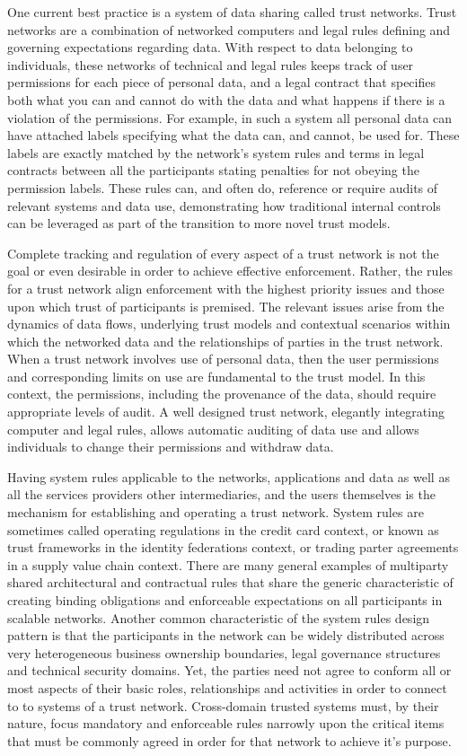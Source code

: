 One current best practice is a system of data sharing called trust networks.
Trust networks are a combination of networked computers and legal rules defining and governing expectations regarding data.
With respect to data belonging to individuals, these networks of technical and legal rules keeps track of user permissions for each piece of personal data, and a legal contract that specifies both what you can and cannot do with the data and what happens if there is a violation of the permissions.
For example, in such a system all personal data can have attached labels specifying what the data can, and cannot, be used for.
These labels are exactly matched by the network's system rules and terms in legal contracts between all the participants stating penalties for not obeying the permission labels.
These rules can, and often do, reference or require audits of relevant systems and data use, demonstrating how traditional internal controls can be leveraged as part of the transition to more novel trust models.

Complete tracking and regulation of every aspect of a trust network is not the goal or even desirable in order to achieve effective enforcement.
Rather, the rules for a trust network align enforcement with the highest priority issues and those upon which trust of participants is premised.
The relevant issues arise from the dynamics of data flows, underlying trust models and contextual scenarios within which the networked data and the relationships of parties in the trust network. 
When a trust network involves use of personal data, then the user permissions and corresponding limits on use are fundamental to the trust model.
In this context, the permissions, including the provenance of the data, should require appropriate levels of audit.
A well designed trust network, elegantly integrating computer and legal rules, allows automatic auditing of data use and allows individuals to change their permissions and withdraw data.

Having system rules applicable to the networks, applications and data as well as all the services providers other intermediaries, and the users themselves is the mechanism for establishing and operating a trust network.
System rules are sometimes called operating regulations in the credit card context, or known as trust frameworks in the identity federations context, or trading parter agreements in a supply value chain context.
There are many general examples of multiparty shared architectural and contractual rules that share the generic characteristic of creating binding obligations and enforceable expectations on all participants in scalable networks.
Another common characteristic of the system rules design pattern is that the participants in the network can be widely distributed across very heterogeneous business ownership boundaries, legal governance structures and technical security domains.
Yet, the parties need not agree to conform all or most aspects of their basic roles, relationships and activities in order to connect to to systems of a trust network.
Cross-domain trusted systems must, by their nature, focus mandatory and enforceable rules narrowly upon the critical items that must be commonly agreed in order for that network to achieve it's purpose.

